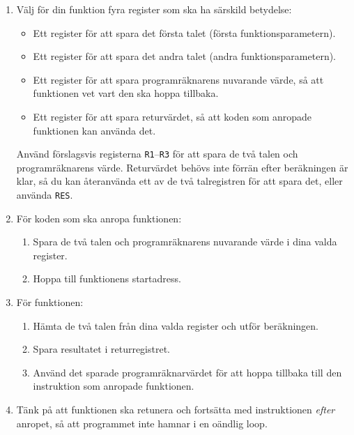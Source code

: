 \begin{Extrauppgifter}
\vspace{-3mm}
\begin{enumerate}
    \item Välj för din funktion fyra register som ska ha särskild betydelse:
          \begin{itemize}
              \item Ett register för att spara det första talet (första funktionsparametern).
              \item Ett register för att spara det andra talet (andra funktionsparametern).
              \item Ett register för att spara programräknarens nuvarande värde, så att funktionen vet vart den ska hoppa tillbaka.
              \item Ett register för att spara returvärdet, så att koden som anropade funktionen kan använda det.
          \end{itemize}

          Använd förslagsvis registerna \texttt{R1}--\texttt{R3} för att spara de två talen och programräknarens värde. Returvärdet behövs inte förrän efter beräkningen är klar, så du kan återanvända ett av de två talregistren för att spara det, eller använda \texttt{RES}.
    \item För koden som ska anropa funktionen:
          \begin{enumerate}
              \item Spara de två talen och programräknarens nuvarande värde i dina valda register.
              \item Hoppa till funktionens startadress.
          \end{enumerate}
    \item För funktionen:
          \begin{enumerate}
              \item Hämta de två talen från dina valda register och utför beräkningen.
              \item Spara resultatet i returregistret.
              \item Använd det sparade programräknarvärdet för att hoppa tillbaka till den instruktion som anropade funktionen.
          \end{enumerate}
    \item Tänk på att funktionen ska retunera och fortsätta med instruktionen \emph{efter} anropet, så att programmet inte hamnar i en oändlig loop.


\end{enumerate}
\end{Extrauppgifter}
